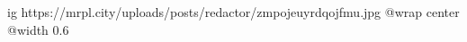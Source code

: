  
 
 
 
 

\ifcmt
  ig https://mrpl.city/uploads/posts/redactor/zmpojeuyrdqojfmu.jpg
  @wrap center
  @width 0.6
\fi

